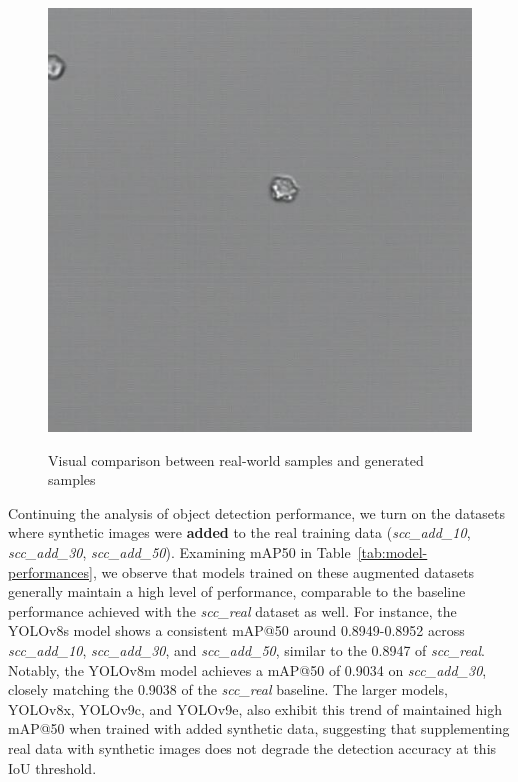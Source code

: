 \begin{figure}
\begin{minipage}[b]{0.49\textwidth}
{\begin{minipage}[t]{0.45\linewidth}
                \includegraphics[width=\linewidth]{images/sample_03338_40_png.rf.7f345a1b9613d2923272c1843a31434c}
                \label{fig:gen2}
            \end{minipage}
        }
    \end{minipage}
    \caption{Visual comparison between real-world samples  and generated samples }
    \label{fig:comparison}
\end{figure}
Continuing the analysis of object detection performance, we turn on the datasets where synthetic images were \textbf{added} to the real training data (\textit{scc\_add\_10}, \textit{scc\_add\_30}, \textit{scc\_add\_50}).
Examining mAP\@50 in Table~\ref{tab:model-performances}, we observe that models trained on these augmented datasets generally maintain a high level of performance, comparable to the baseline performance achieved with the \textit{scc\_real} dataset as well.
For instance, the YOLOv8s model shows a consistent mAP@50 around 0.8949-0.8952 across \textit{scc\_add\_10}, \textit{scc\_add\_30}, and \textit{scc\_add\_50}, similar to the 0.8947 of \textit{scc\_real}.
Notably, the YOLOv8m model achieves a mAP@50 of 0.9034 on \textit{scc\_add\_30}, closely matching the 0.9038 of the \textit{scc\_real} baseline.
The larger models, YOLOv8x, YOLOv9c, and YOLOv9e, also exhibit this trend of maintained high mAP@50 when trained with added synthetic data, suggesting that supplementing real data with synthetic images does not degrade the detection accuracy at this IoU threshold.

